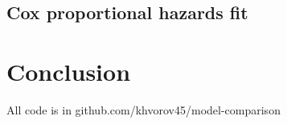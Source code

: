 \documentclass[12pt]{article}
\begin{document}


\subsection{Cox proportional hazards fit}



\section{Conclusion}



\pagebreak

All code is in github.com/khvorov45/model-comparison
\end{document}
